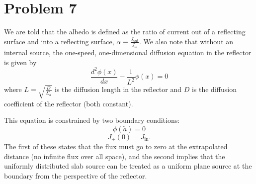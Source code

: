 \documentclass{article}
\begin{document}

\section*{Problem 7}

We are told that the albedo is defined as the ratio of current out of a reflecting surface and into a reflecting surface, $\alpha \equiv \frac{J_{\text{out}}}{J_{\text{in}}}$. We also note that without an internal source, the one-speed, one-dimensional diffusion equation in the reflector is given by
$$ \frac{d^2\phi(x)}{dx} - \frac{1}{L^2}\phi(x) = 0 $$
where $L = \sqrt{\frac{D}{\Sigma_a}}$ is the diffusion length in the reflector and $D$ is the diffusion coefficient of the reflector (both constant).

This equation is constrained by two boundary conditions: 
$$ \phi(\tilde{a}) = 0 $$
$$ J_+(0) = J_{\text{in}} .$$
The first of these states that the flux must go to zero at the extrapolated distance (no infinite flux over all space), and the second implies that the uniformly distributed slab source can be treated as a uniform plane source at the boundary from the perspective of the reflector.
\end{document}
